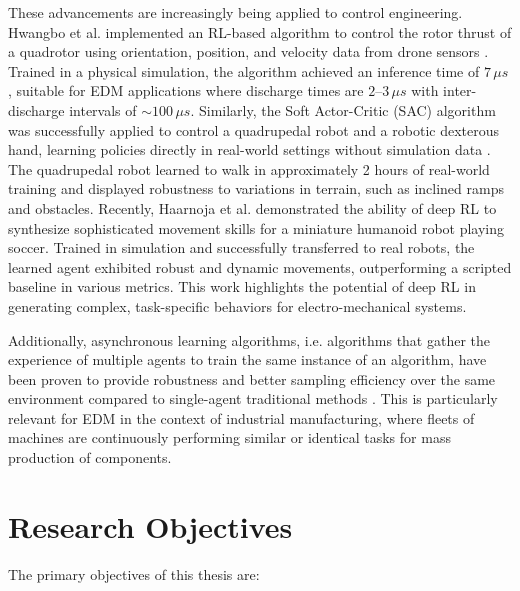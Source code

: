 \documentclass[11pt]{article}
\begin{document}
These advancements are increasingly being applied to control engineering. Hwangbo et al. implemented an RL-based algorithm to control the rotor thrust of a quadrotor using orientation, position, and velocity data from drone sensors \cite{hwangbo2017control}. Trained in a physical simulation, the algorithm achieved an inference time of $7\,\mu s$, suitable for EDM applications where discharge times are $2$--$3\,\mu s$ with inter-discharge intervals of $\sim 100\,\mu s$. Similarly, the Soft Actor-Critic (SAC) algorithm was successfully applied to control a quadrupedal robot and a robotic dexterous hand, learning policies directly in real-world settings without simulation data \cite{DBLP:journals/corr/abs-1812-05905}. The quadrupedal robot learned to walk in approximately 2 hours of real-world training and displayed robustness to variations in terrain, such as inclined ramps and obstacles. Recently, Haarnoja et al. \cite{doi:10.1126/scirobotics.adi8022} demonstrated the ability of deep RL to synthesize sophisticated movement skills for a miniature humanoid robot playing soccer. Trained in simulation and successfully transferred to real robots, the learned agent exhibited robust and dynamic movements, outperforming a scripted baseline in various metrics. This work highlights the potential of deep RL in generating complex, task-specific behaviors for electro-mechanical systems.

Additionally, asynchronous learning algorithms, i.e. algorithms that gather the
experience of multiple agents to train the same instance of an algorithm, have
been proven to provide robustness and better sampling efficiency over the same
environment compared to single-agent traditional methods
\cite{mnih2016asynchronous}. This is particularly relevant for EDM in the context of industrial 
manufacturing, where fleets of machines are continuously performing similar or identical 
tasks for mass production of components.


\section{Research Objectives}

The primary objectives of this thesis are:
\end{document}
